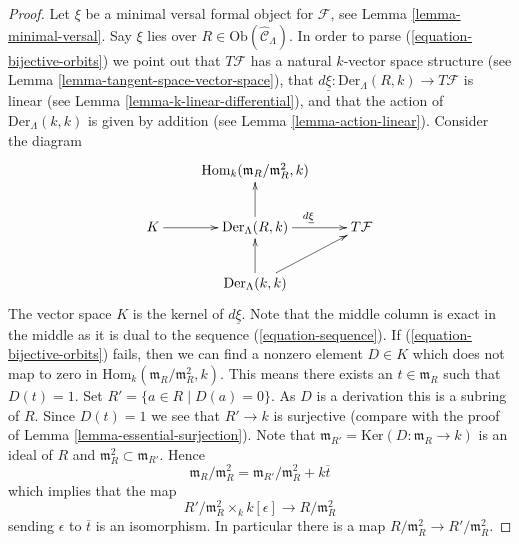 \begin{proof}
Let $\xi$ be a minimal versal formal object for $\mathcal{F}$, see
Lemma \ref{lemma-minimal-versal}.
Say $\xi$ lies over $R \in \text{Ob}(\widehat{\mathcal{C}}_\Lambda)$.
In order to parse (\ref{equation-bijective-orbits}) we point out
that $T\mathcal{F}$ has a natural $k$-vector space structure
(see
Lemma \ref{lemma-tangent-space-vector-space}),
that $d\underline{\xi} : \text{Der}_\Lambda(R, k) \to T\mathcal{F}$
is linear (see
Lemma \ref{lemma-k-linear-differential}),
and that the action of $\text{Der}_\Lambda(k, k)$ is
given by addition (see
Lemma \ref{lemma-action-linear}).
Consider the diagram
$$
\xymatrix{
& \text{Hom}_k(\mathfrak m_R/\mathfrak m_R^2, k) \\
K \ar[r] & \text{Der}_\Lambda(R, k) \ar[r]^{d\underline{\xi}} \ar[u] &
T\mathcal{F} \\
& \text{Der}_\Lambda(k, k) \ar[u] \ar[ru]
}
$$
The vector space $K$ is the kernel of $d\underline{\xi}$.
Note that the middle column is exact in the middle as it is dual to the
sequence (\ref{equation-sequence}). If (\ref{equation-bijective-orbits})
fails, then we can find a nonzero element $D \in K$ which
does not map to zero in $\text{Hom}_k(\mathfrak m_R/\mathfrak m_R^2, k)$.
This means there exists an $t \in \mathfrak m_R$ such that
$D(t) = 1$. Set $R' = \{a \in R \mid D(a) = 0\}$. As $D$ is a derivation
this is a subring of $R$. Since $D(t) = 1$ we see that $R' \to k$
is surjective (compare with the proof of
Lemma \ref{lemma-essential-surjection}).
Note that $\mathfrak m_{R'} = \text{Ker}(D : \mathfrak m_R \to k)$
is an ideal of $R$ and $\mathfrak m_R^2 \subset \mathfrak m_{R'}$. Hence
$$
\mathfrak m_R/\mathfrak m_R^2 =
\mathfrak m_{R'}/\mathfrak m_R^2 + k\overline{t}
$$
which implies that the map
$$
R'/\mathfrak m_R^2 \times_k k[\epsilon] \to R/\mathfrak m_R^2
$$
sending $\epsilon$ to $\overline{t}$ is an isomorphism. In particular
there is a map $R/\mathfrak m_R^2 \to R'/\mathfrak m_R^2$.


\end{proof}
